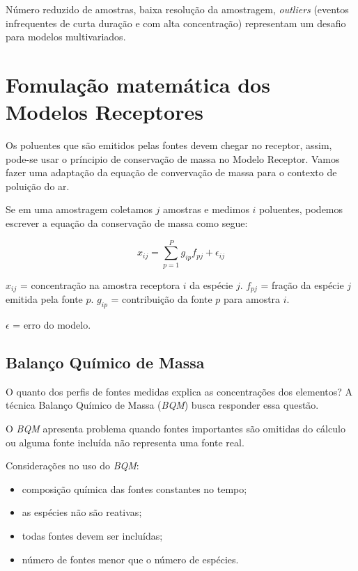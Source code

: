 Número reduzido de amostras, baixa resolução da amostragem, \textit{outliers} 
(eventos infrequentes de curta duração e com alta concentração) representam 
um desafio para modelos multivariados.

\section{Fomulação matemática dos Modelos Receptores}

Os poluentes que são emitidos pelas fontes devem chegar no receptor, assim, 
pode-se usar o príncipio de conservação de massa no Modelo Receptor. 
Vamos fazer uma adaptação da equação de convervação de massa para o contexto 
de poluição do ar. 

Se em uma amostragem coletamos $j$ amostras e medimos $i$ poluentes, podemos 
escrever a equação da conservação de massa como segue: 

\begin{equation}
  x_{ij} = \sum_{p=1}^{P} g_{ip}f_{pj} + \epsilon_{ij}
\end{equation} 

$x_{ij}$ = concentração na amostra receptora $i$ da espécie $j$.
$f_{pj}$ = fração da espécie $j$ emitida pela fonte $p$. 
$g_{ip}$ = contribuição da fonte $p$ para amostra $i$. 

$\epsilon$ = erro do modelo.

\subsection{Balanço Químico de Massa}

O quanto dos perfis de fontes medidas explica as concentrações dos elementos? 
A técnica Balanço Químico de Massa (\textit{BQM}) busca responder essa questão.

O \textit{BQM} apresenta problema quando fontes importantes são omitidas do
cálculo ou alguma fonte incluída não representa uma fonte real.

Considerações no uso do \textit{BQM}: 
\begin{itemize}
  \item composição química das fontes constantes no tempo;
  \item as espécies não são reativas;
  \item todas fontes devem ser incluídas;
  \item número de fontes menor que o número de espécies.
\end{itemize}

